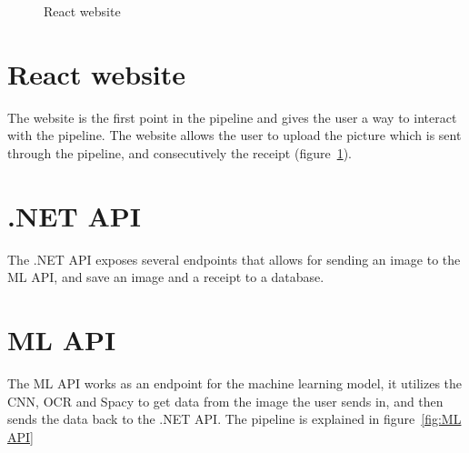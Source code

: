\begin{figure}[h]
    \caption{React website}
    \label{fig:reactWebsite}
\end{figure}


\section{React website}\label{sec:reactWebsite}
The website is the first point in the pipeline and gives the user a way to interact with the pipeline.
The website allows the user to upload the picture which is sent through the pipeline, and consecutively the receipt (figure~\ref{fig:reactWebsite}).

\section{.NET API}\label{sec:.NET API}
The .NET API exposes several endpoints that allows for sending an image to the ML API, and save an image and a receipt to a database.

\section{ML API}\label{sec:ML API}
The ML API works as an endpoint for the machine learning model, it utilizes the CNN, OCR and Spacy to get data from
the image the user sends in, and then sends the data back to the .NET API\@.
The pipeline is explained in figure~\ref{fig:ML API}



